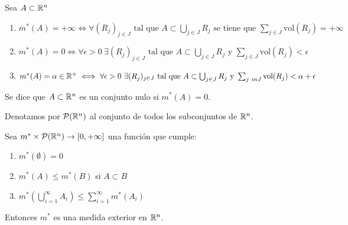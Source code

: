 \begin{observación}
Sea $A \subset \mathbb{R}^n$
\begin{enumerate}
    \item $m^*(A) = +\infty \iff \forall (R_j)_{j \in J} \text{ tal que } A \subset \bigcup_{j \in J} R_j \text{ se tiene que } \sum_{j \in J} \text{vol}(R_j) = +\infty$
    \item $m^*(A) = 0 \iff \forall \epsilon > 0 \ \exists (R_j)_{j \in J} \text{ tal que } A \subset \bigcup_{j \in J} R_j \text{ y } \sum_{j \in J} \text{vol}(R_j) < \epsilon$
    \item $m^*(A) = \alpha \in \mathbb{R}^+ \iff \forall \epsilon > 0 \ \exists (R_j)_{j \in J} \text{ tal que } A \subset \bigcup_{j \in J} R_j \text{ y } \sum_{j \ in J} \text{vol}(R_j) < \alpha + \epsilon$
\end{enumerate}
\end{observación}

\label{Conjunto nulo}
\begin{definición}
Se dice que $A \subset \mathbb{R}^n$ es un conjunto nulo si $m^*(A) = 0$.
\end{definición}


Denotamos por $\mathcal{P}(\mathbb{R}^n)$ al conjunto de todos los subconjuntos de
$\mathbb{R}^n$.
\begin{teorema}
    Sea $m^* \times \mathcal{P}(\mathbb{R}^n) \to [0, +\infty]$ una función que cumple:
    \begin{enumerate}
        \item $m^*(\emptyset) = 0$
        \item $m^*(A) \leq m^*(B)$ si $A \subset B$
        \item $m^*(\bigcup_{i=1}^\infty A_i) \leq \sum_{i=1}^\infty m^*(A_i)$
    \end{enumerate}
    Entonces $m^*$ es una medida exterior en $\mathbb{R}^n$.
\end{teorema}

